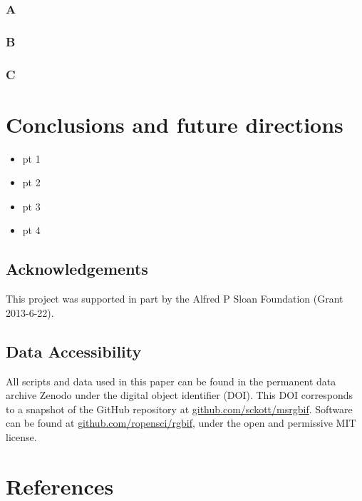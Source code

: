 \documentclass[author-year, review, 11pt]{components/elsarticle} %
\begin{document}
\subsubsection{A}\label{a}

\subsubsection{B}\label{b}

\subsubsection{C}\label{c}

\section{Conclusions and future
directions}\label{conclusions-and-future-directions}

\begin{itemize}
\itemsep1pt\parskip0pt
\item
  pt 1
\item
  pt 2
\item
  pt 3
\item
  pt 4
\end{itemize}

\subsection{Acknowledgements}\label{acknowledgements}

This project was supported in part by the Alfred P Sloan Foundation
(Grant 2013-6-22).

\subsection{Data Accessibility}\label{data-accessibility}

All scripts and data used in this paper can be found in the permanent
data archive Zenodo under the digital object identifier (DOI). This DOI
corresponds to a snapshot of the GitHub repository at
\href{https://github.com/sckott/msrgbif}{github.com/sckott/msrgbif}.
Software can be found at
\href{https://github.com/ropensci/rgbif}{github.com/ropensci/rgbif},
under the open and permissive MIT license.

\section*{References}\label{references}
\end{document}
